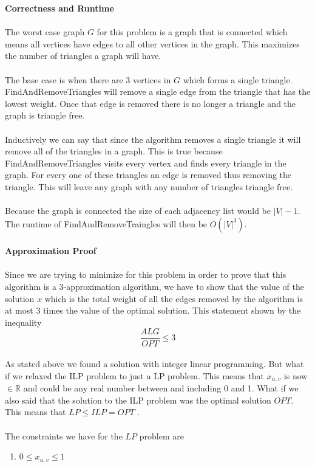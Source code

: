 \documentclass[12pt]{article}
\begin{document}
\begin{enumerate}
  \textbf{Correctness and Runtime}\\
  \\
  The worst case graph $G$ for this problem is a graph 
  that is connected
  which means all vertices have edges to all other vertices in the graph.
  This maximizes the number of triangles a graph will have.\\
  \\
  The base case is 
  when there are 3 vertices in $G$ which forms a single triangle. 
  FindAndRemoveTriangles will remove a single edge from the triangle that has
  the lowest weight.
  Once that edge is removed there is no longer a triangle and the graph is
  triangle free.\\
  \\
  Inductively we can say that since the algorithm removes
  a single triangle it will remove all of the triangles in a graph.  This is
  true because FindAndRemoveTriangles visits every vertex and finds every 
  triangle in the graph.  
  For every one of these triangles an edge is removed thus removing the
  triangle.  This will leave any graph with any number of triangles triangle 
  free.\\
  \\
  Because the graph is connected the size of each adjacency list
  would be $|V|-1$.  The runtime of FindAndRemoveTraingles will then 
  be $O(|V|^3)$.\\
  \\
  \textbf{Approximation Proof}\\
  \\
  Since we are trying to minimize for this problem in order to prove that this
  algorithm is a 3-approximation algorithm, we have to show that the value of 
  the solution $x$
  which is the total weight of all the edges removed by the algorithm
  is at most 3 times the value of the optimal solution.  This statement shown by
  the inequality 
  $$
  \frac{ALG}{OPT} \le 3
  $$
  \\
  As stated above we found a solution with integer linear programming.  But what
  if we relaxed the ILP problem to just a LP problem.  This means that $x_{u,v}$
  is now $\in \mathbb{R}$ and could be any real number between and including 0
  and 1.  What if we also said that the solution to the ILP problem was the
  optimal solution $OPT$.  This means that $LP \le ILP = OPT$ \cite{1}.\\
  \\
  The constraints we have for the $LP$ problem are
  \begin{enumerate}
    \item 
    $0 \le x_{u,v} \le 1$
    

\end{enumerate}
\end{enumerate}
\end{document}
